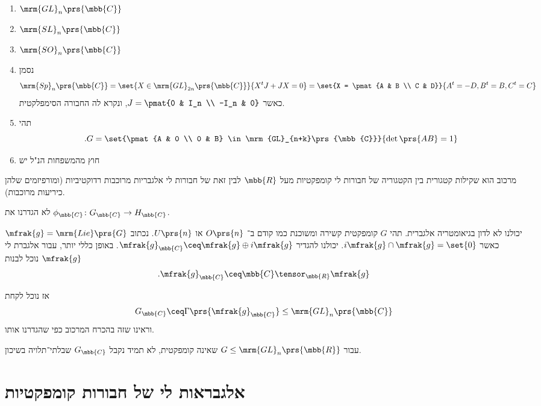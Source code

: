 \documentclass[10pt, twoside]{book}
\newcommand{\Lie}{\mrm{Lie}}
\begin{document}
\begin{example}
\begin{enumerate}
\item $\mrm{GL}_n\prs{\mbb{C}}$
\item $\mrm{SL}_n\prs{\mbb{C}}$
\item $\mrm{SO}_n\prs{\mbb{C}}$
\item נסמן
\[\mrm{Sp}_n\prs{\mbb{C}} = \set{X \in \mrm{GL}_{2n}\prs{\mbb{C}}}{X^t J + JX = 0} = \set{X = \pmat{A & B \\ C & D}}{A^t = -D, B^t = B, C^t = C}\]
כאשר
$J = \pmat{0 & I_n \\ -I_n & 0}$,
ונקרא לה החבורה הסימפלקטית.
\item תהי
\[\text{.}G = \set{\pmat{A & 0 \\ 0 & B} \in \mrm{GL}_{n+k}\prs{\mbb{C}}}{\det\prs{AB} = 1}\]
\item חוץ מהמשפחות הנ"ל יש 
\end{enumerate}
\end{example}



\begin{remark}
מרכוב הוא שקילות קטגורית בין הקטגוריה של חבורות לי קומפקטיות מעל
$\mbb{R}$
לבין זאת של חבורות לי אלגבריות מרוכבות רדוקטיביות (ומורפיזמים שלהן כיריעות מרוכבות).

לא הגדרנו את
$\phi_{\mbb{C}} \colon G_{\mbb{C}} \to H_{\mbb{C}}$.
\end{remark}

\begin{remark}
יכולנו לא לדון בגיאומטריה אלגברית.
תהי
$G$
קומפקטית קשירה ומשוכנת כמו קודם ב־%
$O\prs{n}$
או
$U\prs{n}$.
נכתוב
$\mfrak{g} = \Lie\prs{G}$
כאשר
$i\mfrak{g} \cap \mfrak{g} = \set{0}$.
יכולנו להגדיר
$\mfrak{g}_{\mbb{C}} \ceq \mfrak{g} \oplus i \mfrak{g}$.
באופן כללי יותר, עבור אלגברת לי
$\mfrak{g}$
נוכל לבנות
\[\text{.} \mfrak{g}_{\mbb{C}} \ceq \mbb{C} \tensor_{\mbb{R}} \mfrak{g}\]

אז נוכל לקחת
\[G_{\mbb{C}} \ceq \Gamma\prs{\mfrak{g}_{\mbb{C}}} \leq \mrm{GL}_n\prs{\mbb{C}}\]
וראינו שזה בהכרח המרכוב כפי שהגדרנו אותו.
\end{remark}

\begin{remark}
עבור
$G \leq \mrm{GL}_n\prs{\mbb{R}}$
שאינה קומפקטית, לא תמיד נקבל
$G_{\mbb{C}}$
שבלתי־תלויה בשיכון.
\end{remark}

\section{אלגבראות לי של חבורות קומפקטיות}
\end{document}
